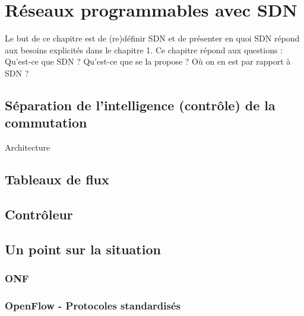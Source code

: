 \chapter{Réseaux programmables avec SDN}

Le but de ce chapitre est de (re)définir SDN et de présenter en quoi SDN répond aux besoins explicités dans le chapitre 1.
Ce chapitre répond aux questions : Qu'est-ce que SDN ? Qu'est-ce que se la propose ? Où on en est par rapport à SDN ?

\section{Séparation de l'intelligence (contrôle) de la commutation}

Architecture

\section{Tableaux de flux}

\section{Contrôleur}

\section{Un point sur la situation}
\subsection{ONF}

\subsection{OpenFlow - Protocoles standardisés}
